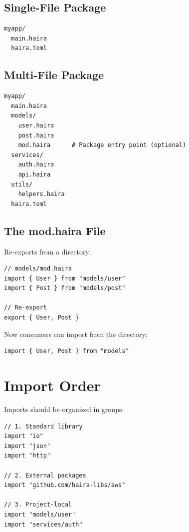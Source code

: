 \subsection{Single-File Package}

\begin{lstlisting}[language={}]
myapp/
  main.haira
  haira.toml
\end{lstlisting}

\subsection{Multi-File Package}

\begin{lstlisting}[language={}]
myapp/
  main.haira
  models/
    user.haira
    post.haira
    mod.haira      # Package entry point (optional)
  services/
    auth.haira
    api.haira
  utils/
    helpers.haira
  haira.toml
\end{lstlisting}

\subsection{The mod.haira File}

Re-exports from a directory:

\begin{lstlisting}
// models/mod.haira
import { User } from "models/user"
import { Post } from "models/post"

// Re-export
export { User, Post }
\end{lstlisting}

Now consumers can import from the directory:

\begin{lstlisting}
import { User, Post } from "models"
\end{lstlisting}

\section{Import Order}

Imports should be organized in groups:

\begin{lstlisting}
// 1. Standard library
import "io"
import "json"
import "http"

// 2. External packages
import "github.com/haira-libs/aws"

// 3. Project-local
import "models/user"
import "services/auth"
\end{lstlisting}

